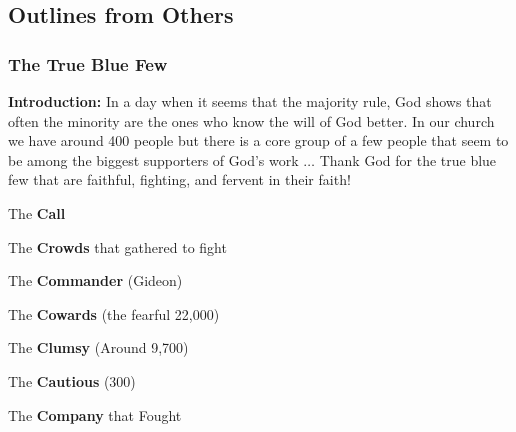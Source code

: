 \subsection{Outlines from Others}

\subsubsection{The True Blue Few}
\textbf{Introduction:} In a day when it seems that the majority rule, God shows that often the minority are the ones who know the will of God better. In our church we have around 400 people but there is a core group of a few people that seem to be among the biggest supporters of God's work $\hdots$ Thank God for the true blue few that are faithful, fighting, and fervent in their faith!
\begin{compactenum}[I.][8]
\item The \textbf{Call}
	\item The \textbf{Crowds} that gathered to fight
    \item The \textbf{Commander} (Gideon)
    \item The \textbf{Cowards} (the fearful 22,000)
    \item The \textbf{Clumsy} (Around 9,700)
    \item The \textbf{Cautious} (300)
    \item The \textbf{Company} that Fought
\end{compactenum}
